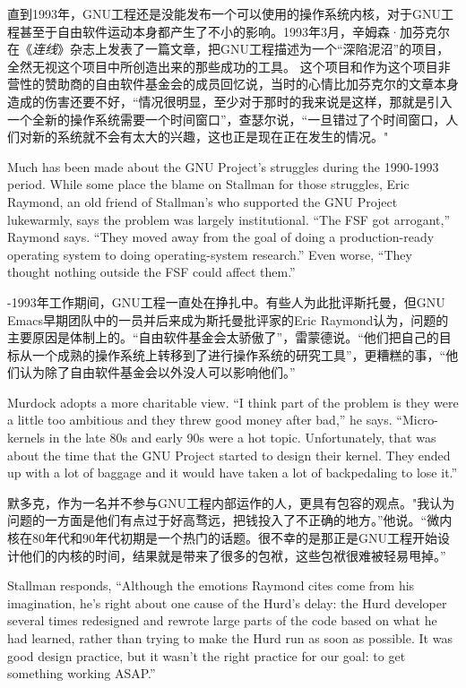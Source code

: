 \ifdefined\chs
直到1993年，GNU工程还是没能发布一个可以使用的操作系统内核，对于GNU工程甚至于自由软件运动本身都产生了不小的影响。1993年3月，辛姆森·加芬克尔在《\textit{连线}》杂志上发表了一篇文章，把GNU工程描述为一个``深陷泥沼''的项目，全然无视这个项目中所创造出来的那些成功的工具。 这个项目和作为这个项目非营性的赞助商的自由软件基金会的成员回忆说，当时的心情比加芬克尔的文章本身造成的伤害还要不好，``情况很明显，至少对于那时的我来说是这样，那就是引入一个全新的操作系统需要一个时间窗口''，查瑟尔说，``一旦错过了个时间窗口，人们对新的系统就不会有太大的兴趣，这也正是现在正在发生的情况。"
\fi

\ifdefined\eng
Much has been made about the GNU Project's struggles during the 1990-1993 period. While some place the blame on Stallman for those struggles, Eric Raymond, an old friend of Stallman's who supported the GNU Project lukewarmly, says the problem was largely institutional. ``The FSF got arrogant,'' Raymond says. ``They moved away from the goal of doing a production-ready operating system to doing operating-system research.'' Even worse, ``They thought nothing outside the FSF could affect them.''
\fi

\ifdefined{}-1993年工作期间，GNU工程一直处在挣扎中。有些人为此批评斯托曼，但GNU Emacs早期团队中的一员并后来成为斯托曼批评家的Eric Raymond认为，问题的主要原因是体制上的。``自由软件基金会太骄傲了''，雷蒙德说。``他们把自己的目标从一个成熟的操作系统上转移到了进行操作系统的研究工具''，更糟糕的事，``他们认为除了自由软件基金会以外没人可以影响他们。''
\fi

\ifdefined\eng
Murdock adopts a more charitable view. ``I think part of the problem is they were a little too ambitious and they threw good money after bad,'' he says. ``Micro-kernels in the late 80s and early 90s were a hot topic. Unfortunately, that was about the time that the GNU Project started to design their kernel. They ended up with a lot of baggage and it would have taken a lot of backpedaling to lose it.''
\fi

\ifdefined\chs
默多克，作为一名并不参与GNU工程内部运作的人，更具有包容的观点。"我认为问题的一方面是他们有点过于好高骛远，把钱投入了不正确的地方。''他说。``微内核在80年代和90年代初期是一个热门的话题。很不幸的是那正是GNU工程开始设计他们的内核的时间，结果就是带来了很多的包袱，这些包袱很难被轻易甩掉。''
\fi

\ifdefined\eng
Stallman responds, ``Although the emotions Raymond cites come from his imagination, he's right about one cause of the Hurd's delay: the Hurd developer several times redesigned and rewrote large parts of the code based on what he had learned, rather than trying to make the Hurd run as soon as possible.  It was good design practice, but it wasn't the right practice for our goal: to get something working ASAP.''
\fi

